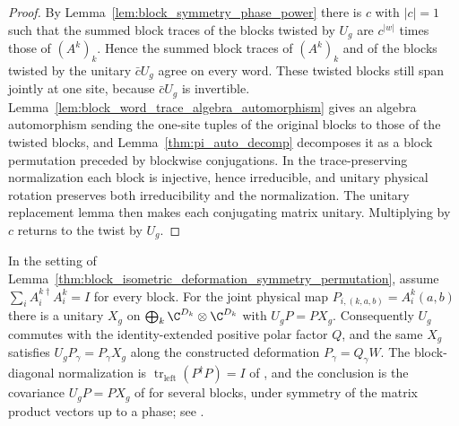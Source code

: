 \begin{proof}
    \leanok
    By Lemma~\ref{lem:block_symmetry_phase_power} there is $c$ with $|c|=1$
    such that the summed block traces of the blocks twisted by $U_g$ are
    $c^{|w|}$ times those of $(A^k)_k$. Hence the summed block traces of
    $(A^k)_k$ and of the blocks twisted by the unitary $\bar cU_g$ agree on
    every word. These twisted blocks still span jointly at one site,
    because $\bar cU_g$ is invertible. Lemma~\ref{lem:block_word_trace_algebra_automorphism}
    gives an algebra automorphism sending the one-site tuples of the
    original blocks to those of the twisted blocks, and
    Lemma~\ref{thm:pi_auto_decomp} decomposes it as a block
    permutation preceded by blockwise conjugations. In the
    trace-preserving normalization each block is injective, hence
    irreducible, and unitary physical rotation preserves both
    irreducibility and the normalization. The unitary replacement lemma
    then makes each conjugating matrix unitary. Multiplying by $c$ returns
    to the twist by $U_g$.
\end{proof}

\begin{lemma}
    \label{thm:block_isometric_deformation_covariance}
    \leanok
    In the setting of
    Lemma~\ref{thm:block_isometric_deformation_symmetry_permutation},
    assume $\sum_iA^{k\dagger}_iA^k_i=I$ for every block. For the joint
    physical map $P_{i,(k,a,b)}=A^k_i(a,b)$ there is a unitary $X_g$ on
    $\bigoplus_k\C^{D_k}\otimes\C^{D_k}$ with $U_gP=PX_g$. Consequently
    $U_g$ commutes with the identity-extended positive polar factor $Q$,
    and the same $X_g$ satisfies $U_gP_\gamma=P_\gamma X_g$ along the
    constructed deformation $P_\gamma=Q_\gamma W$.
    The block-diagonal normalization is
    $\operatorname{tr}_{\mathrm{left}}(P^\dagger P)=I$ of
    \cite[line~653]{Schuch2011Phases}, and the conclusion is the
    covariance $U_gP=PX_g$ of \cite[lines~652--660]{Schuch2011Phases}
    for several blocks, under symmetry of the matrix product vectors up to
    a phase; see \cite{gap:spc11_isometric_symmetry_unitary_virtual}.
\end{lemma}

